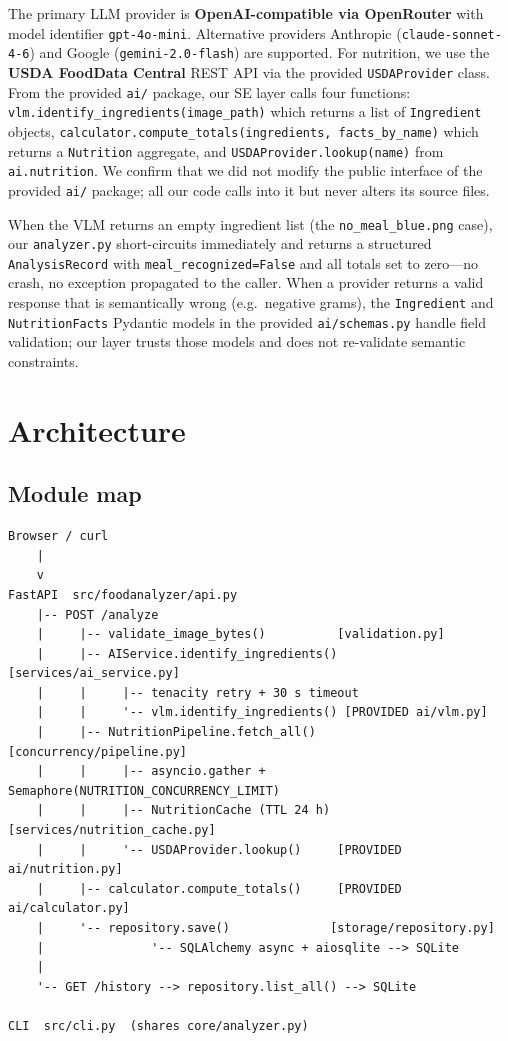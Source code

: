 \documentclass[11pt,a4paper]{article}
\begin{document}
The primary LLM provider is \textbf{OpenAI-compatible via OpenRouter} with model identifier \texttt{gpt-4o-mini}. Alternative providers Anthropic (\texttt{claude-sonnet-4-6}) and Google (\texttt{gemini-2.0-flash}) are supported. For nutrition, we use the \textbf{USDA FoodData Central} REST API via the provided \texttt{USDAProvider} class. From the provided \texttt{ai/} package, our SE layer calls four functions: \texttt{vlm.identify\_ingredients(image\_path)} which returns a list of \texttt{Ingredient} objects, \texttt{calculator.compute\_totals(ingredients, facts\_by\_name)} which returns a \texttt{Nutrition} aggregate, and \texttt{USDAProvider.lookup(name)} from \texttt{ai.nutrition}. We confirm that we did not modify the public interface of the provided \texttt{ai/} package; all our code calls into it but never alters its source files.

When the VLM returns an empty ingredient list (the \texttt{no\_meal\_blue.png} case), our \texttt{analyzer.py} short-circuits immediately and returns a structured \texttt{AnalysisRecord} with \texttt{meal\_recognized=False} and all totals set to zero---no crash, no exception propagated to the caller. When a provider returns a valid response that is semantically wrong (e.g.\ negative grams), the \texttt{Ingredient} and \texttt{NutritionFacts} Pydantic models in the provided \texttt{ai/schemas.py} handle field validation; our layer trusts those models and does not re-validate semantic constraints.

\section{Architecture}\label{sec:arch}

\subsection{Module map}

\begin{lstlisting}[numbers=none,basicstyle=\ttfamily\small,backgroundcolor=\color{backcolour}]
Browser / curl
    |
    v
FastAPI  src/foodanalyzer/api.py
    |-- POST /analyze
    |     |-- validate_image_bytes()          [validation.py]
    |     |-- AIService.identify_ingredients() [services/ai_service.py]
    |     |     |-- tenacity retry + 30 s timeout
    |     |     '-- vlm.identify_ingredients() [PROVIDED ai/vlm.py]
    |     |-- NutritionPipeline.fetch_all()   [concurrency/pipeline.py]
    |     |     |-- asyncio.gather + Semaphore(NUTRITION_CONCURRENCY_LIMIT)
    |     |     |-- NutritionCache (TTL 24 h) [services/nutrition_cache.py]
    |     |     '-- USDAProvider.lookup()     [PROVIDED ai/nutrition.py]
    |     |-- calculator.compute_totals()     [PROVIDED ai/calculator.py]
    |     '-- repository.save()              [storage/repository.py]
    |               '-- SQLAlchemy async + aiosqlite --> SQLite
    |
    '-- GET /history --> repository.list_all() --> SQLite

CLI  src/cli.py  (shares core/analyzer.py)
\end{lstlisting}
\end{document}
